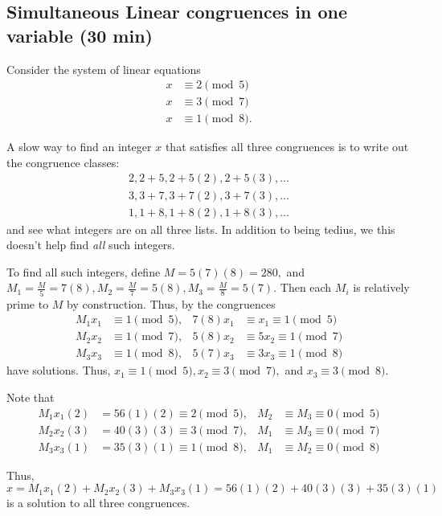 \documentclass[letterpaper, 11 pt]{ximera}
\begin{document}
\subsection{Simultaneous Linear congruences in one variable (30 min)}


\begin{example}
    Consider the system of linear equations 
    \begin{align*}
        x &\equiv 2 \pmod{5}\\
        x &\equiv 3 \pmod{7}\\
        x &\equiv 1 \pmod{8}.
    \end{align*}

    A slow way to find an integer $x$ that satisfies all three congruences is to write out the congruence classes:
    \begin{align*}
        2, 2+5, 2+5(2), \boxed{2+5(3)}, \dots\\
        3, 3+7, \boxed{3+7(2)}, 3+7(3), \dots\\
        1, 1+8, 1+8(2), \boxed{1+8(3)}, \dots
    \end{align*}
    and see what integers are on all three lists. In addition to being tedius, we this doesn't help find \emph{all} such integers.

    To find all such integers, define $M=5(7)(8)=280,$ and $M_1=\frac{M}{5}=7(8),M_2=\frac{M}{7}=5(8),M_3=\frac{M}{8}=5(7).$ Then each $M_i$ is relatively prime to $M$ by construction. Thus, by  the congruences
    \begin{align*}
        M_1x_1 & \equiv 1\pmod 5, & 7(8)x_1&\equiv x_1 \equiv 1\pmod 5\\
        M_2x_2 & \equiv 1\pmod 7, & 5(8)x_2 &\equiv 5x_2 \equiv 1\pmod 7\\
        M_3x_3 & \equiv 1\pmod 8, & 5(7)x_3&\equiv 3x_3\equiv 1\pmod 8
    \end{align*}
    have solutions. Thus, $x_1\equiv 1\pmod{5}, x_2\equiv 3\pmod{7},$ and $x_3\equiv 3\pmod{8}.$

    Note that 
    \begin{align*}
        M_1x_1(2)&=56(1)(2)\equiv 2\pmod 5, & M_2&\equiv M_3\equiv 0\pmod{5}\\
        M_2x_2(3)&=40(3)(3)\equiv 3\pmod 7, & M_1&\equiv M_3\equiv 0\pmod{7}\\
        M_3x_3(1)&=35(3)(1)\equiv 1\pmod 8, & M_1&\equiv M_2\equiv 0\pmod{8}
    \end{align*}

    Thus, \[x=M_1x_1(2)+M_2x_2(3)+M_3x_3(1)=56(1)(2)+40(3)(3)+35(3)(1)\]
    is a solution to all three congruences.
\end{example}
\end{document}
